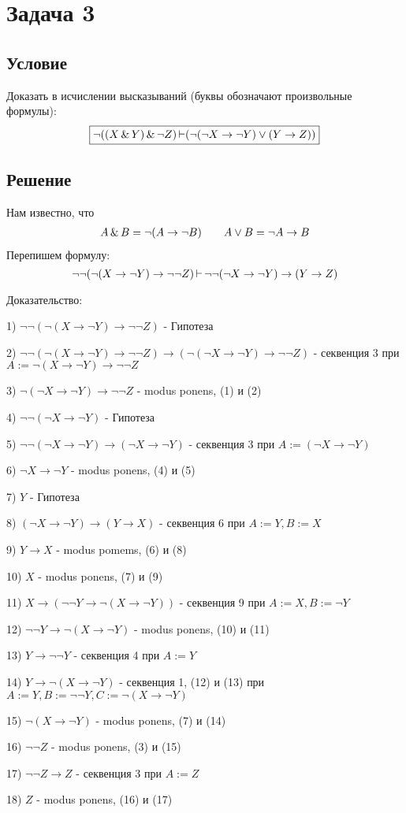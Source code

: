 

\usepackage{karnaugh-map}


\chapter{Задача 3}

\section{Условие}

Доказать в исчислении высказываний (буквы обозначают произвольные
формулы):
\[
    \boxed{
        \lnot((X\operatorname{\&} Y)\operatorname{\&} \lnot Z) \operatorname{\vdash} (\lnot(\lnot X \to \lnot Y) \lor (Y \to Z))
    }
\] 


\section{Решение}

Нам известно, что
\[
\begin{matrix}
    A\operatorname{\&} B = \lnot(A \to \lnot B) && A \lor B = \lnot A \to B
\end{matrix}
\] 
Перепишем формулу:
\[
\lnot\lnot(\lnot(X \to \lnot Y) \to \lnot\lnot Z) \operatorname{\vdash} \lnot\lnot(\lnot X \to \lnot Y) \to (Y \to Z)
\] 


Доказательство:

1) $\lnot\lnot(\lnot(X \to \lnot Y) \to \lnot\lnot Z)$ - Гипотеза

2) $\lnot\lnot(\lnot(X \to \lnot Y) \to \lnot\lnot Z) \to (\lnot(\lnot X \to \lnot Y) \to \lnot\lnot Z)$ -
секвенция 3 при $A := \lnot(X \to \lnot Y) \to \lnot\lnot Z$

3) $\lnot(\lnot X \to \lnot Y) \to \lnot\lnot Z$ - modus ponens, (1) и (2)

4) $\lnot\lnot(\lnot X \to \lnot Y)$ - Гипотеза

5) $\lnot\lnot(\lnot X \to \lnot Y) \to (\lnot X \to \lnot Y)$ - секвенция 3 при $A := 
(\lnot X \to \lnot Y)$

6) $\lnot X \to \lnot Y$ - modus ponens, (4) и (5)

7) $Y$ - Гипотеза

8) $(\lnot X \to \lnot Y) \to (Y \to X)$ - секвенция 6 при $ A:= Y, B := X$

9)  $Y \to X$ - modus pomems, (6) и (8)

10) $X$ - modus ponens, (7) и (9)

11)  $X \to (\lnot \lnot Y\to \lnot(X \to \lnot Y))$ - секвенция 9 при $A:=X, B:=\lnot Y$

12) $\lnot \lnot Y\to \lnot(X \to \lnot Y)$ - modus ponens, (10) и (11)

13)  $Y \to \lnot\lnot Y$ - секвенция 4 при $A:=Y$

14)  $Y \to \lnot(X \to \lnot Y)$ - секвенция 1, (12) и (13) при $A:=Y,B:=\lnot\lnot Y,
C:=\lnot(X \to \lnot Y)$

15) $\lnot(X \to \lnot Y)$ - modus ponens, (7) и (14)

16) $\lnot\lnot Z$ - modus ponens, (3) и (15)

17)  $\lnot\lnot Z \to Z$ - секвенция 3 при $A := Z$

18)  $Z$ - modus ponens, (16) и (17)


